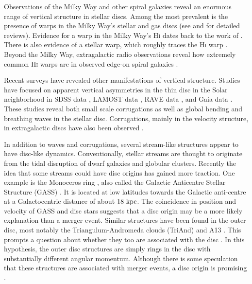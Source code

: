
Observations of the Milky Way and other spiral galaxies reveal an enormous range of vertical structure in stellar discs. Among the most prevalent is the presence of warps in the Milky Way's stellar and gas discs (see \citet{binney_1992} and \citet{Sellwood2013} for detailed reviews). Evidence for a warp in the Milky Way's \textsc{Hi} dates  back to the work of \citet{oort_1958}.  There is also evidence of a stellar warp, which roughly traces the \textsc{Hi} warp \citep{cox_1996, reyle_2009}. Beyond the Milky Way, extragalactic radio observations reveal how extremely common \textsc{Hi} warps are in observed edge-on spiral galaxies \citep[see][for example]{sancisi_1976,bosma_1991, garcia-ruiz_2002}. 

Recent surveys have revealed other manifestations of vertical structure. Studies have focused on apparent vertical asymmetries in the thin disc in the Solar neighborhood in SDSS data \citep{widrow_2012_sdss, xu_2015}, LAMOST data \citep{carlin_2013_lamost, pearl_2017}, RAVE data \citep{williams_2013_rave, carrillo_2018_rave}, and Gaia data \citep{gaia_collab,bennet_2019_gaia}. These studies reveal both small scale corrugations as well as global bending and breathing waves in the stellar disc. Corrugations, mainly in the velocity structure, in extragalactic discs have also been observed \citep[for example]{matthews_2008,sanchez_2015}. 

In addition to waves and corrugations, several stream-like structures appear to have disc-like dynamics. Conventionally, stellar streams are thought to originate from the tidal disruption of dwarf galaxies and globular clusters. Recently the idea that some streams could have disc origins has gained more traction. One example is the Monoceros ring \citep{newberg_2002, yanny_2003}, also called the Galactic Anticentre Stellar Structure (GASS) \citep{crane_2003, rocha-pinto_2003}. It is located at low latitudes towards the Galactic anti-centre at a Galactocentric distance of about $18\,\,\text{kpc}$.  The coincidence in position and velocity of GASS and disc stars suggests that a disc origin may be a more likely explanation than a merger event. Similar structures have been found in the outer disc, most notably the Triangulum-Andromeda clouds (TriAnd) \citep{triand_discovery} and A13 \citep{a13_discovery}. This prompts a question about whether they too are associated with the disc \citep{johnston_kud_review}. In this hypothesis, the outer disc structures are simply rings in the disc with substantially different angular momentum. Although there is some speculation that these structures are associated with merger events, a disc origin is promising \citep{deason_2018,monoceros_disk_origin}.\\



